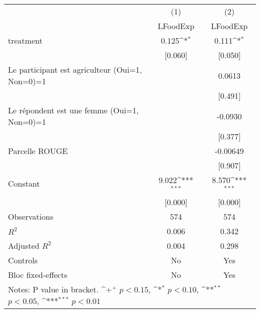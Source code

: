 {
\def\sym#1{\ifmmode^{#1}\else\(^{#1}\)\fi}
\begin{tabular*}{1.2\hsize}{@{\hskip\tabcolsep\extracolsep\fill}l*{2}{c}}
\cline{2-3}\cline{2-3}
     &\multicolumn{1}{c}{(1)}&\multicolumn{1}{c}{(2)}\\
     &\multicolumn{1}{c}{LFoodExp}&\multicolumn{1}{c}{LFoodExp}\\
\cline{2-3}
treatment&0.125\sym{*}  &0.111\sym{*}  \\
     &[0.060]         &[0.050]         \\
[1em]
Le participant est agriculteur (Oui=1, Non=0)=1&           &0.0613         \\
     &           &[0.491]         \\
[1em]
Le répondent est une femme (Oui=1, Non=0)=1&           &-0.0930         \\
     &           &[0.377]         \\
[1em]
Parcelle ROUGE&           &-0.00649         \\
     &           &[0.907]         \\
[1em]
Constant&9.022\sym{***}&8.570\sym{***}\\
     &[0.000]         &[0.000]         \\
\cline{2-3}
Observations&574         &574         \\
\(R^{2}\)&0.006         &0.342         \\
Adjusted \(R^{2}\)&0.004         &0.298         \\
Controls&No         &Yes         \\
Bloc fixed-effects&No         &Yes         \\
\cline{2-3}\cline{2-3}
\multicolumn{3}{p{1.0\textwidth}}{\footnotesize Notes: P value in bracket. \sym{+} \(p<0.15\), \sym{*} \(p<0.10\), \sym{**} \(p<0.05\), \sym{***} \(p<0.01\)}\\
\end{tabular*}
}

